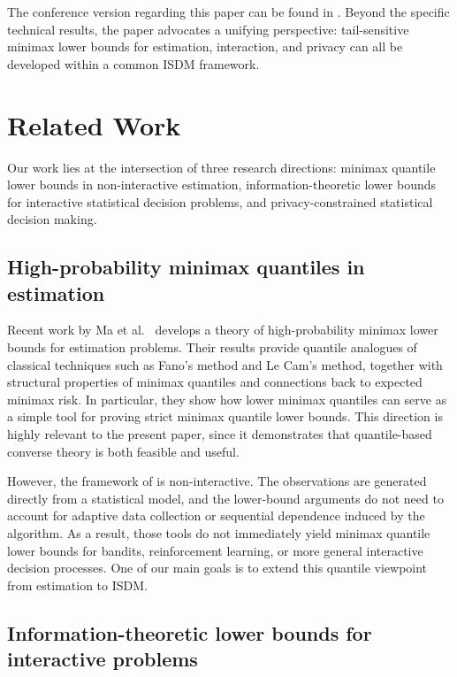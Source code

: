 \documentclass[journal]{IEEEtran}
\begin{document}
The conference version regarding this paper can be found in \cite{bongole2026risk}.
Beyond the specific technical results, the paper advocates a unifying perspective: tail-sensitive minimax lower bounds for estimation, interaction, and privacy can all be developed within a common ISDM framework.


\section{Related Work}
\label{sec:related}

Our work lies at the intersection of three research directions: minimax quantile lower bounds in non-interactive estimation, information-theoretic lower bounds for interactive statistical decision problems, and privacy-constrained statistical decision making.

\subsection{High-probability minimax quantiles in estimation}

Recent work by Ma et al.\ \cite{ma2024high} develops a theory of high-probability minimax lower bounds for estimation problems. Their results provide quantile analogues of classical techniques such as Fano's method and Le Cam's method, together with structural properties of minimax quantiles and connections back to expected minimax risk. In particular, they show how lower minimax quantiles can serve as a simple tool for proving strict minimax quantile lower bounds. This direction is highly relevant to the present paper, since it demonstrates that quantile-based converse theory is both feasible and useful.

However, the framework of \cite{ma2024high} is non-interactive. The observations are generated directly from a statistical model, and the lower-bound arguments do not need to account for adaptive data collection or sequential dependence induced by the algorithm. As a result, those tools do not immediately yield minimax quantile lower bounds for bandits, reinforcement learning, or more general interactive decision processes. One of our main goals is to extend this quantile viewpoint from estimation to ISDM.

\subsection{Information-theoretic lower bounds for interactive problems}
\end{document}
